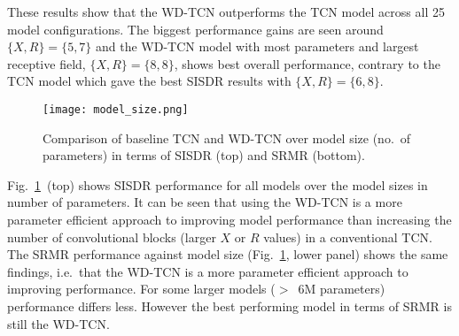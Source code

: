 \documentclass{article}
\begin{document}
These results show that the \ac{WD-TCN} outperforms the \ac{TCN} model across all 25 model configurations. The biggest performance gains are seen around $\{X,R\} = \{5,7\}$ and the \ac{WD-TCN} model with most parameters and largest receptive field, $\{X,R\}=\{8,8\}$, shows best overall performance, contrary to the \ac{TCN} model which gave the best SISDR results with $\{X,R\}=\{6,8\}$. 
\begin{figure}[!t]
    \centering
    \texttt{[image: model\_size.png]}
    \caption{Comparison of baseline \ac{TCN} and \ac{WD-TCN} over model size (no.~of parameters) in terms of 
\ac{SISDR} (top) and 
\ac{SRMR} (bottom).}
    \label{fig:nparams}
\end{figure}
Fig.~\ref{fig:nparams}~(top) shows 
\ac{SISDR} performance for all models over the model sizes in number of parameters. It can be seen that using the \ac{WD-TCN} is a more parameter efficient approach to improving model performance than increasing the number of convolutional blocks (larger $X$ or $R$ values) in a conventional \ac{TCN}.
The 
\ac{SRMR} performance against model size (Fig.~\ref{fig:nparams}, lower panel) shows the same findings, i.e.~that the \ac{WD-TCN} is a more parameter efficient approach to improving performance. For some larger models ($>$~6M parameters) performance differs less. However the best performing model in terms of \ac{SRMR} is still the \ac{WD-TCN}.
\end{document}
